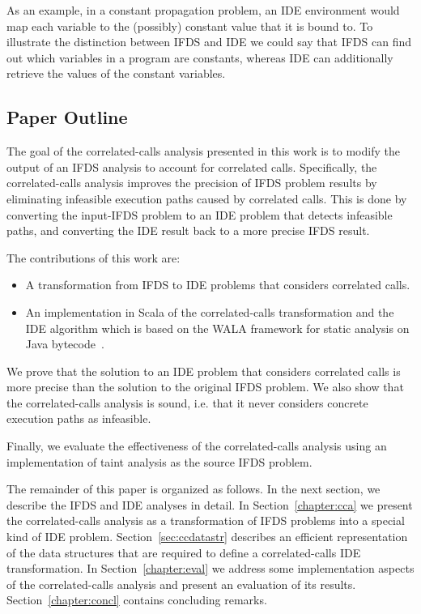 As an example, in a constant propagation problem, an IDE environment would map each variable to the (possibly) constant value that it is bound to. To illustrate the distinction between IFDS and IDE we could say that IFDS can find out which variables in a program are constants, whereas IDE can additionally retrieve the values of the constant variables.

\subsection{Paper Outline}

The goal of the correlated-calls analysis presented in this work is to modify the output of an IFDS analysis to account for correlated calls. Specifically, the correlated-calls analysis improves the precision of IFDS problem results by eliminating infeasible execution paths caused by correlated calls. This is done by converting the input-IFDS problem to an IDE problem that detects infeasible paths, and converting the IDE result back to a more precise IFDS result.

The contributions of this work are:
\begin{itemize}
  \item A transformation from IFDS to IDE problems that considers correlated calls.
  \item An implementation in Scala of the correlated-calls transformation and the IDE algorithm which is based on the WALA framework for static analysis on Java bytecode~\cite{fink2012wala}.
\end{itemize}

  We prove that the solution to an IDE problem that considers correlated calls is more precise than the solution to the original IFDS problem.
  We also show that the correlated-calls analysis is sound, i.e. that it never considers concrete execution paths as infeasible.
 
 Finally, we evaluate the effectiveness of the correlated-calls analysis using an implementation of taint analysis as the source IFDS problem.

The remainder of this paper is organized as follows. In the next section, we describe the IFDS and IDE analyses in detail. In Section~\ref{chapter:cca} we present the correlated-calls analysis as a transformation of IFDS problems into a special kind of IDE problem. Section~\ref{sec:ccdatastr} describes an efficient representation of the data structures that are required to define a correlated-calls IDE transformation.
In Section~\ref{chapter:eval} we address some implementation aspects of the correlated-calls analysis and present an evaluation of its results. Section~\ref{chapter:concl} contains concluding remarks.
